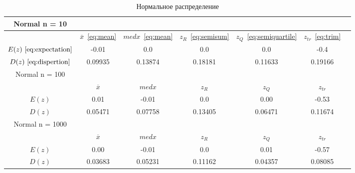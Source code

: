 \documentclass[12pt,a4paper]{scrartcl}
\begin{document}
\begin{table}[H]
  \centering
  \begin{tabular}{ | c | c | c | c | c | c | c | }
	\hline
	Normal n = 10 & & & & &  \\ \hline
	& $\overline x$~\eqref{eq:mean} & $med x$~\eqref{eq:mean}& $z_R $~\eqref{eq:semisum} & $z_Q $~\eqref{eq:semiquartile}  &  $z_{tr}$~\eqref{eq:trim}  \\ \hline
	$E(z) ~\eqref{eq:expectation}$ & -0.01 & 0.0 & 0.0 & 0.0 & -0.4 \\ \hline
	$D(z) ~\eqref{eq:dispertion}$ & 0.09935 & 0.13874 & 0.18181 & 0.11633 & 0.19166 \\ \hline
	
	Normal n = 100 & & & & &  \\ \hline
	& $\overline x$ & $med x$& $z_R $& $z_Q $&  $z_{tr}$\\ \hline
	$E(z)$ & 0.01 & -0.01 & 0.0 & 0.00 & -0.53 \\ \hline
	$D(z)$ & 0.05471 & 0.07758 & 0.13405 & 0.06471 & 0.11674 \\ \hline
	
	Normal n = 1000 & & & & &  \\ \hline
	& $\overline x$ & $med x$& $z_R $& $z_Q $&  $z_{tr}$\\ \hline
	$E(z)$ & 0.00 & -0.01 & 0.0 & 0.01 &-0.57 \\ \hline
	$D(z)$ & 0.03683 & 0.05231 & 0.11162 & 0.04357 & 0.08085 \\ \hline
	\end{tabular}
  \label{table:normal_table}
\caption{Нормальное распределение}
\end{table}
\end{document}
